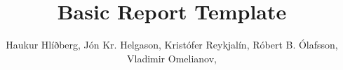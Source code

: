 
\renewcommand{\d}[1]{\;\textsf{d}#1}
\newcommand{\pd}[1]{\partial #1}
\newcommand{\D}{\;\textsf{D}}
\providecommand{\e}[1]{\ensuremath{\times 10^{#1}}}
\newcommand{\kg}[1]{\SI{#1}{\kilo\gram}}
\newcommand{\mA}[1]{\SI{#1}{\milli\ampere}}
\newcommand{\amp}[1]{SI{#1}{\ampere\xspace}}


\newcommand{\realset}{\ensuremath{\mathbb{R}}}
\newcommand{\intset}{\ensuremath{\mathbb{Z}}}
\newcommand{\ratset}{\ensuremath{\mathbb{Q}}}


\newcommand{\adfr}{\ensuremath{\text{FR}}}
\newcommand{\addp}{\ensuremath{\text{DP}}}
\newcommand{\adpv}{\ensuremath{\text{PV}}}

\newcommand{\cfigure}[2]{\begin{figure}[h]
\centering %
\texttt{[image: \#1]}%
\caption{#2\label{fig:#1}}%
\end{figure}%
}
\newcommand{\cfiguresize}[3]{\begin{figure}[h]
\centering %
\texttt{[image: \#1]}%
\caption{#2\label{fig:#1}}%
\end{figure}%
}

\author{Haukur Hlíðberg, Jón Kr. Helgason, Kristófer Reykjalín, Róbert B. Ólafsson, Vladimir Omelianov,}  %
\title{Basic Report Template}  %
\graphicspath{{graphics/}{Graphics/}{./}}

\usepackage[backend=biber, bibencoding=utf8, style=ieee]{biblatex}


\usepackage{caption}
\captionsetup[figure]{name=Mynd}

\usepackage[final,hidelinks]{hyperref} %
